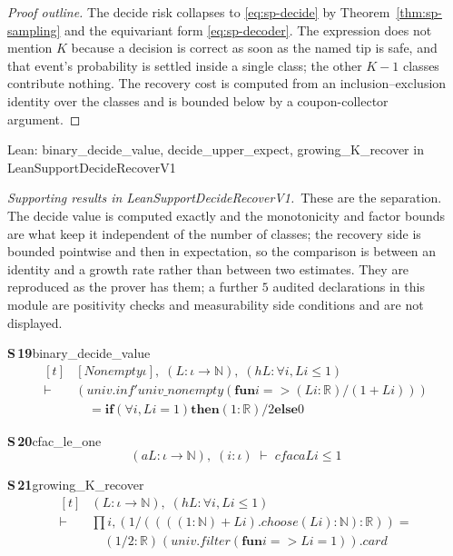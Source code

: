 \documentclass[conference]{IEEEtran}
\theoremstyle{definition}
\newcommand{\lean}[1]{\textsf{\footnotesize #1}}
\newcommand{\leanbox}[1]{%
  \par\vspace{2pt}\noindent
  {\footnotesize\textsf{Lean: #1}}\par\vspace{2pt}}
\begin{document}
\begin{proof}[Proof outline]
The decide risk collapses to \eqref{eq:sp-decide} by Theorem~\ref{thm:sp-sampling} and the
equivariant form \eqref{eq:sp-decoder}. The expression does not mention $K$ because a decision is
correct as soon as the named tip is safe, and that event's probability is settled inside a
single class; the other $K-1$ classes contribute nothing. The recovery cost is computed from
an inclusion--exclusion identity over the classes and is bounded below by a coupon-collector
argument.
\end{proof}

\leanbox{\lean{binary\_decide\_value}, \lean{decide\_upper\_expect},
\lean{growing\_K\_recover} in \lean{LeanSupportDecideRecoverV1}}

\noindent\emph{Supporting results in \lean{LeanSupportDecideRecoverV1}.}~These are the separation. The decide value is computed exactly and the monotonicity and factor bounds are what keep it independent of the number of classes; the recovery side is bounded pointwise and then in expectation, so the comparison is between an identity and a growth rate rather than between two estimates. They are reproduced as the prover has them; a further $5$ audited declarations in this module are positivity checks and measurability side conditions and are not displayed.

\noindent\textbf{S\,19}\quad\lean{binary\_decide\_value}
{\footnotesize\[ \begin{aligned}[t]
&[\mathit{Nonempty} \iota ],\; (\mathit{L} : \iota \to \mathbb{N} ),\; (\mathit{hL} : \forall \mathit{i}, \mathit{L} \mathit{i} \leq 1)\\
\vdash\;&(\mathit{univ}.\mathit{inf'} \mathit{univ\_nonempty} (\mathbf{fun} \mathit{i} => (\mathit{L} \mathit{i} : \mathbb{R} ) / (1 + \mathit{L} \mathit{i})))\\
&\quad = \mathbf{if} (\forall \mathit{i}, \mathit{L} \mathit{i} = 1) \mathbf{then} (1 : \mathbb{R} ) / 2 \mathbf{else} 0
\end{aligned} \]}

\noindent\textbf{S\,20}\quad\lean{cfac\_le\_one}
{\footnotesize\[ (\mathit{a} \mathit{L} : \iota \to \mathbb{N} ),\; (\mathit{i} : \iota ) \;\vdash\; \mathit{cfac} \mathit{a} \mathit{L} \mathit{i} \leq 1 \]}

\noindent\textbf{S\,21}\quad\lean{growing\_K\_recover}
{\footnotesize\[ \begin{aligned}[t]
&(\mathit{L} : \iota \to \mathbb{N} ),\; (\mathit{hL} : \forall \mathit{i}, \mathit{L} \mathit{i} \leq 1)\\
\vdash\;&\textstyle\prod \mathit{i}, (1 / ((((1:\mathbb{N} ) + \mathit{L} \mathit{i}).\mathit{choose} (\mathit{L} \mathit{i}) : \mathbb{N} ) : \mathbb{R} )) =\\
&\quad (1 / 2 : \mathbb{R} ) ^{} (\mathit{univ}.\mathit{filter} (\mathbf{fun} \mathit{i} => \mathit{L} \mathit{i} = 1)).\mathit{card}
\end{aligned} \]}
\end{document}
